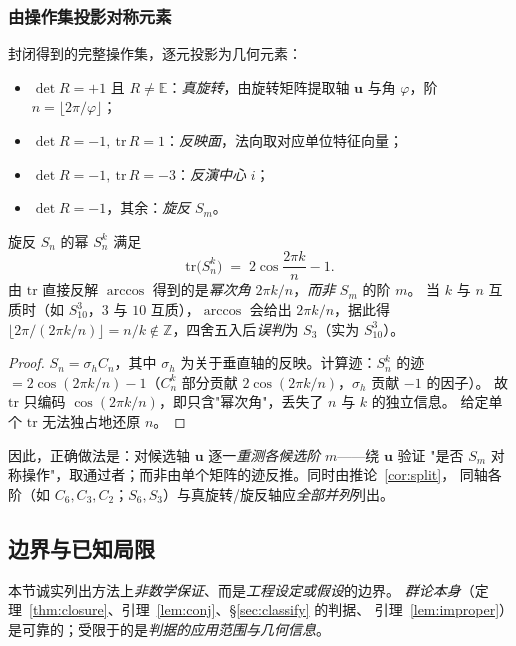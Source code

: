 \subsubsection{由操作集投影对称元素}
封闭得到的完整操作集，逐元投影为几何元素：
\begin{itemize}
  \item $\det R=+1$ 且 $R\neq\mathbb{E}$：\emph{真旋转}，由旋转矩阵提取轴 $\mathbf u$ 与角 $\varphi$，阶 $n=\lfloor 2\pi/\varphi\rfloor$；
  \item $\det R=-1,\ \mathrm{tr}\,R=1$：\emph{反映面}，法向取对应单位特征向量；
  \item $\det R=-1,\ \mathrm{tr}\,R=-3$：\emph{反演中心} $i$；
  \item $\det R=-1$，其余：\emph{旋反} $S_m$。
\end{itemize}
\begin{lemma}\label{lem:improper}
  旋反 $S_n$ 的幂 $S_n^k$ 满足
  \begin{equation}
    \mathrm{tr}\bigl(S_n^k\bigr) \;=\; 2\cos\frac{2\pi k}{n}-1 .
  \end{equation}
  由 $\mathrm{tr}$ 直接反解 $\arccos$ 得到的是\emph{幂次角} $2\pi k/n$，\emph{而非} $S_m$ 的阶 $m$。
  当 $k$ 与 $n$ 互质时（如 $S_{10}^3$，$3$ 与 $10$ 互质），$\arccos$ 会给出 $2\pi k/n$，据此得
  $\lfloor 2\pi/(2\pi k/n)\rfloor=n/k\notin\mathbb Z$，四舍五入后\emph{误判}为 $S_3$（实为 $S_{10}^3$）。
\end{lemma}
\begin{proof}
  $S_n=\sigma_h C_n$，其中 $\sigma_h$ 为关于垂直轴的反映。计算迹：$S_n^k$ 的迹
  $=2\cos(2\pi k/n)-1$（$C_n^k$ 部分贡献 $2\cos(2\pi k/n)$，$\sigma_h$ 贡献 $-1$ 的因子）。
  故 $\mathrm{tr}$ 只编码 $\cos(2\pi k/n)$，即只含"幂次角"，丢失了 $n$ 与 $k$ 的独立信息。
  给定单个 $\mathrm{tr}$ 无法独占地还原 $n$。\qedhere
\end{proof}

因此，正确做法是：对候选轴 $\mathbf u$ 逐一\emph{重测各候选阶} $m$——绕 $\mathbf u$ 验证
"是否 $S_m$ 对称操作"，取通过者；而非由单个矩阵的迹反推。同时由推论~\ref{cor:split}，
同轴各阶（如 $C_6,C_3,C_2$；$S_6,S_3$）与真旋转/旋反轴应\emph{全部并列}列出。

\subsection{边界与已知局限}\label{sec:limit}

本节诚实列出方法上\emph{非数学保证}、而是\emph{工程设定或假设}的边界。
\emph{群论本身}（定理~\ref{thm:closure}、引理~\ref{lem:conj}、\S\ref{sec:classify} 的判据、
引理~\ref{lem:improper}）是可靠的；受限于的是\emph{判据的应用范围与几何信息}。

